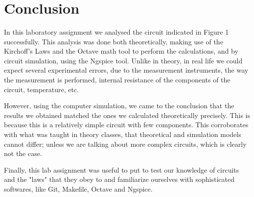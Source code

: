 \section{Conclusion}
\label{sec:conclusion}

\paragraph{} In this laboratory assignment we analysed the circuit indicated in Figure 1 successfully. This analysis was done both theoretically, making use of the Kirchoff's Laws
 and the Octave math tool to perform the calculations, and by circuit simulation, using the Ngspice tool. Unlike in theory, in real life we could expect several experimental 
errors, due to the measurement instruments, the way the measurement is performed, internal resistance of the components of the circuit, temperature, etc.

However, using the computer simulation, we came to the conclusion that the results we obtained matched the ones we calculated theoretically precisely.
This is because this is a relatively simple circuit with few components. This corroborates with what was taught in theory classes, that theoretical and simulation models
 cannot differ; unless we are talking about more complex circuits, which is clearly not the case.

Finally, this lab assignment was useful to put to test our knowledge of circuits and the "laws" that they obey to and familiarize ourselves with sophisticated softwares,
 like Git, Makefile, Octave and Ngspice.